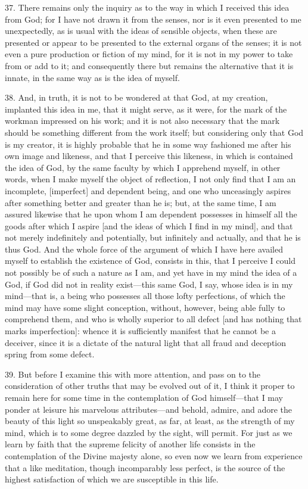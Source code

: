 37. There remains only the inquiry as to the way in which I received this idea from God; for I have not drawn it from the senses, nor is it even presented to me unexpectedly, as is usual with the ideas of sensible objects, when these are presented or appear to be presented to the external organs of the senses; it is not even a pure production or fiction of my mind, for it is not in my power to take from or add to it; and consequently there but remains the alternative that it is innate, in the same way as is the idea of myself.

38. And, in truth, it is not to be wondered at that God, at my creation, implanted this idea in me, that it might serve, as it were, for the mark of the workman impressed on his work; and it is not also necessary that the mark should be something different from the work itself; but considering only that God is my creator, it is highly probable that he in some way fashioned me after his own image and likeness, and that I perceive this likeness, in which is contained the idea of God, by the same faculty by which I apprehend myself, in other words, when I make myself the object of reflection, I not only find that I am an incomplete, [imperfect] and dependent being, and one who unceasingly aspires after something better and greater than he is; but, at the same time, I am assured likewise that he upon whom I am dependent possesses in himself all the goods after which I aspire [and the ideas of which I find in my mind], and that not merely indefinitely and potentially, but infinitely and actually, and that he is thus God. And the whole force of the argument of which I have here availed myself to establish the existence of God, consists in this, that I perceive I could not possibly be of such a nature as I am, and yet have in my mind the idea of a God, if God did not in reality exist—this same God, I say, whose idea is in my mind—that is, a being who possesses all those lofty perfections, of which the mind may have some slight conception, without, however, being able fully to comprehend them, and who is wholly superior to all defect [and has nothing that marks imperfection]: whence it is sufficiently manifest that he cannot be a deceiver, since it is a dictate of the natural light that all fraud and deception spring from some defect.

39. But before I examine this with more attention, and pass on to the consideration of other truths that may be evolved out of it, I think it proper to remain here for some time in the contemplation of God himself—that I may ponder at leisure his marvelous attributes—and behold, admire, and adore the beauty of this light so unspeakably great, as far, at least, as the strength of my mind, which is to some degree dazzled by the sight, will permit. For just as we learn by faith that the supreme felicity of another life consists in the contemplation of the Divine majesty alone, so even now we learn from experience that a like meditation, though incomparably less perfect, is the source of the highest satisfaction of which we are susceptible in this life.